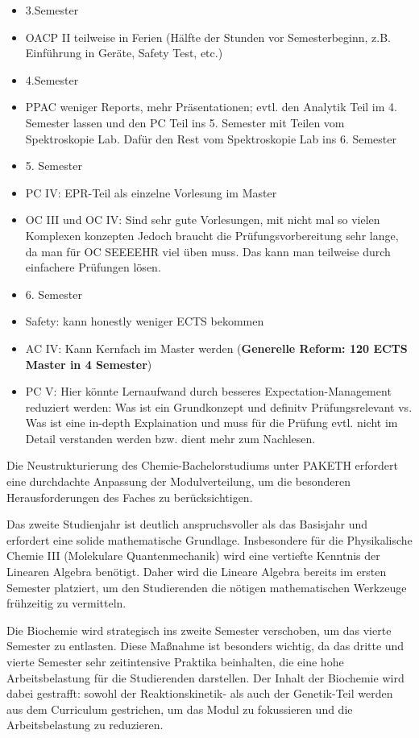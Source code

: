 \documentclass[a4paper]{article}
\begin{document}
\begin{itemize}
    \item 3.Semester\\
    \item OACP II teilweise in Ferien (Hälfte der Stunden vor Semesterbeginn, z.B. Einführung in Geräte, Safety Test, etc.)
    \item 4.Semester\\
    \item PPAC weniger Reports, mehr Präsentationen; evtl. den Analytik Teil im 4. Semester lassen und den PC Teil ins 5. Semester mit Teilen vom Spektroskopie Lab. Dafür den Rest vom Spektroskopie Lab ins 6. Semester  
    \item 5. Semester\\
    \item PC IV: EPR-Teil als einzelne Vorlesung im Master
    \item OC III und OC IV: Sind sehr gute Vorlesungen, mit nicht mal so vielen Komplexen konzepten Jedoch braucht die Prüfungsvorbereitung sehr lange, da man für OC SEEEEHR viel üben muss. Das kann man teilweise durch einfachere Prüfungen lösen. 
    \item 6. Semester\\
    \item Safety: kann honestly weniger ECTS bekommen
    \item AC IV: Kann Kernfach im Master werden (\textbf{Generelle Reform: 120 ECTS Master in 4 Semester})
    \item PC V: Hier könnte Lernaufwand durch besseres Expectation-Management reduziert werden: Was ist ein Grundkonzept und definitv Prüfungsrelevant vs. Was ist eine in-depth Explaination und muss für die Prüfung evtl. nicht im Detail verstanden werden bzw. dient mehr zum Nachlesen.
\end{itemize}

Die Neustrukturierung des Chemie-Bachelorstudiums unter PAKETH erfordert eine durchdachte Anpassung der Modulverteilung, um die besonderen Herausforderungen des Faches zu berücksichtigen.

Das zweite Studienjahr ist deutlich anspruchsvoller als das Basisjahr und erfordert eine solide mathematische Grundlage. Insbesondere für die Physikalische Chemie III (Molekulare Quantenmechanik) wird eine vertiefte Kenntnis der Linearen Algebra benötigt. Daher wird die Lineare Algebra bereits im ersten Semester platziert, um den Studierenden die nötigen mathematischen Werkzeuge frühzeitig zu vermitteln.

Die Biochemie wird strategisch ins zweite Semester verschoben, um das vierte Semester zu entlasten. Diese Maßnahme ist besonders wichtig, da das dritte und vierte Semester sehr zeitintensive Praktika beinhalten, die eine hohe Arbeitsbelastung für die Studierenden darstellen. Der Inhalt der Biochemie wird dabei gestrafft: sowohl der Reaktionskinetik- als auch der Genetik-Teil werden aus dem Curriculum gestrichen, um das Modul zu fokussieren und die Arbeitsbelastung zu reduzieren.
\end{document}
